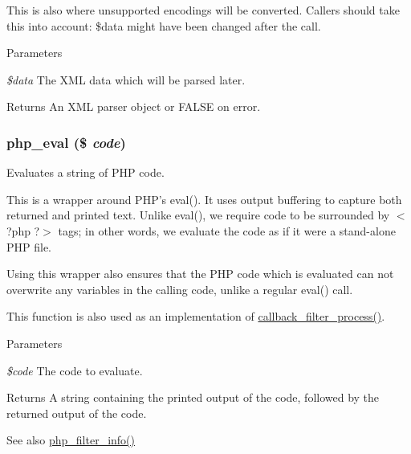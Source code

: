 This is also where unsupported encodings will be converted. Callers should take this into account: \$data might have been changed after the call.


\begin{DoxyParams}{Parameters}
\item[{\em \$data}]The XML data which will be parsed later.\end{DoxyParams}
\begin{DoxyReturn}{Returns}
An XML parser object or FALSE on error. 
\end{DoxyReturn}
\hypertarget{group__php__wrappers_ga116b8b70b569d3b04f7e0717c8984ed6}{
\subsubsection[{php\_\-eval}]{\setlength{\rightskip}{0pt plus 5cm}php\_\-eval (\$ {\em code})}}
\label{group__php__wrappers_ga116b8b70b569d3b04f7e0717c8984ed6}
Evaluates a string of PHP code.

This is a wrapper around PHP's eval(). It uses output buffering to capture both returned and printed text. Unlike eval(), we require code to be surrounded by $<$?php ?$>$ tags; in other words, we evaluate the code as if it were a stand-\/alone PHP file.

Using this wrapper also ensures that the PHP code which is evaluated can not overwrite any variables in the calling code, unlike a regular eval() call.

This function is also used as an implementation of \hyperlink{group__callbacks_ga5f82accd878d144a22ea2dfec253f91d}{callback\_\-filter\_\-process()}.


\begin{DoxyParams}{Parameters}
\item[{\em \$code}]The code to evaluate.\end{DoxyParams}
\begin{DoxyReturn}{Returns}
A string containing the printed output of the code, followed by the returned output of the code.
\end{DoxyReturn}
\begin{DoxySeeAlso}{See also}
\hyperlink{php_8module_a623699ac83c3473534eb2b8a96f052d2}{php\_\-filter\_\-info()} 
\end{DoxySeeAlso}
